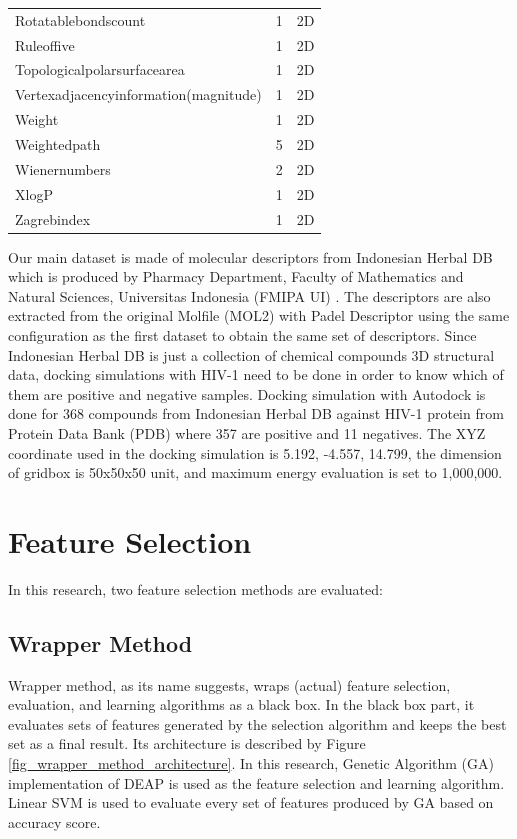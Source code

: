 \documentclass[conference,compsoc,12pt]{IEEEtran}
\begin{document}
\begin{table}
\begin{tabular}{|l|c|c|}
		Rotatablebondscount & 	1  & 2D \\
		Ruleoffive & 	1  & 2D \\
		Topologicalpolarsurfacearea & 	1  & 2D \\
		Vertexadjacencyinformation(magnitude) & 	1  & 2D \\
		Weight & 	1  & 2D \\
		Weightedpath & 	5  & 2D \\
		Wienernumbers & 	2  & 2D \\
		XlogP & 	1  & 2D \\
		Zagrebindex & 	1  & 2D \\	
		\hline 
	\end{tabular} 
	\end{table}	
	
	Our main dataset is made of molecular descriptors from Indonesian Herbal DB which is produced by Pharmacy Department, Faculty of Mathematics and Natural Sciences, Universitas Indonesia (FMIPA UI) \cite{yanuar2011medicinal}. The descriptors are also extracted from the original Molfile (MOL2) with Padel Descriptor using the same configuration as the first dataset to obtain the same set of descriptors. Since Indonesian Herbal DB is just a collection of chemical compounds 3D structural data, docking simulations with HIV-1 need to be done in order to know which of them are positive and negative samples. Docking simulation with Autodock is done for 368 compounds from Indonesian Herbal DB against HIV-1 protein from Protein Data Bank (PDB) where 357 are positive and 11 negatives. The XYZ coordinate used in the docking simulation is 5.192, -4.557, 14.799, the dimension of gridbox is 50x50x50 unit, and maximum energy evaluation is set to 1,000,000.
	
	\section{Feature Selection} \label{Feature Selection}
	
	In this research, two feature selection methods are evaluated:

	\subsection{Wrapper Method}
	
	Wrapper method, as its name suggests, wraps (actual) feature selection, evaluation, and learning algorithms as a black box\cite{tang2014feature}. In the black box part, it evaluates sets of features generated by the selection algorithm and keeps the best set as a final result. Its architecture is described by Figure \ref{fig_wrapper_method_architecture}. In this research, Genetic Algorithm (GA) implementation of DEAP \cite{DEAP_JMLR2012} is used as the feature selection and learning algorithm. Linear SVM is used to evaluate every set of features produced by GA based on accuracy score.
	
\end{document}
